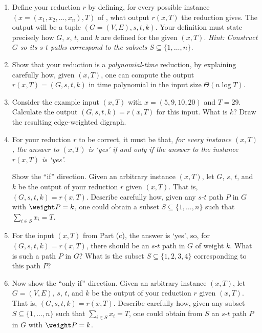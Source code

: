 \documentclass[11pt]{article}
\begin{document}
\begin{enumerate}[label=(\alph*)]

\item
  Define your reduction $r$
  by defining, for every possible instance $(x=(x_1, x_2, \ldots, x_n), T)$ of  ,
  what output $r(x, T)$ the reduction gives.
  The output will be a tuple $(G=(V, E), s, t, k)$.
  Your definition must state precisely how $G$, $s$, $t$, and $k$ are defined for the given $(x, T)$.
  \emph{Hint: Construct $G$ so its $s$-$t$ paths correspond to the subsets $S\subseteq\{1,\ldots,n\}$.}

\item
  Show that your reduction is a \emph{polynomial-time} reduction,
  by explaining carefully how, given $(x, T)$, one can compute the output $r(x, T)=(G, s, t, k)$
  in time polynomial in the input size $\Theta(n\log T)$.

\item
  Consider the example input $(x, T)$ with $x=(5, 9, 10, 20)$ and $T=29$.
  Calculate the output $(G, s, t, k) = r(x, T)$ for this input.
  What is $k$? 
  Draw the resulting edge-weighted digraph.  

\item
  For your reduction $r$ to be correct,
  it must be that, \emph{for every   instance $(x, T)$,
    the answer to $(x, T)$ is `\textsf{yes}' if and only if the answer to the  instance $r(x, T)$ is `\textsf{yes}'.}

  Show the ``if'' direction.
  Given an arbitrary  instance $(x, T)$,
  let $G$, $s$, $t$, and $k$ be the output of your reduction $r$ given $(x, T)$.  That is, $(G, s, t, k) = r(x, T)$.
  Describe carefully how, given any $s$-$t$ path $P$ in $G$ with $\weight P = k$,
  one could obtain a subset $S\subseteq \{1,\ldots,n\}$ such that $\sum_{i\in S} x_i = T$.

\item
  For the input $(x, T)$ from Part (c), the answer is `\textsf{yes}',
  so, for $(G, s, t, k)=r(x, T)$, there should be an $s$-$t$ path in $G$ of weight $k$.
  What is such a path $P$ in $G$?
  What is the subset $S\subseteq \{1,2,3,4\}$ corresponding to this path $P$?

\item
  Now show the ``only if'' direction.
  Given an arbitrary  instance $(x, T)$,
  let $G=(V, E)$, $s$, $t$, and $k$ be the output of your reduction $r$ given $(x, T)$.  That is, $(G, s, t, k) = r(x, T)$.
  Describe carefully how, given any subset $S\subseteq \{1,\ldots,n\}$ such that $\sum_{i\in S} x_i = T$,
  one could obtain from $S$ an $s$-$t$ path $P$ in $G$ with $\weight P = k$.

\end{enumerate}
\end{document}
